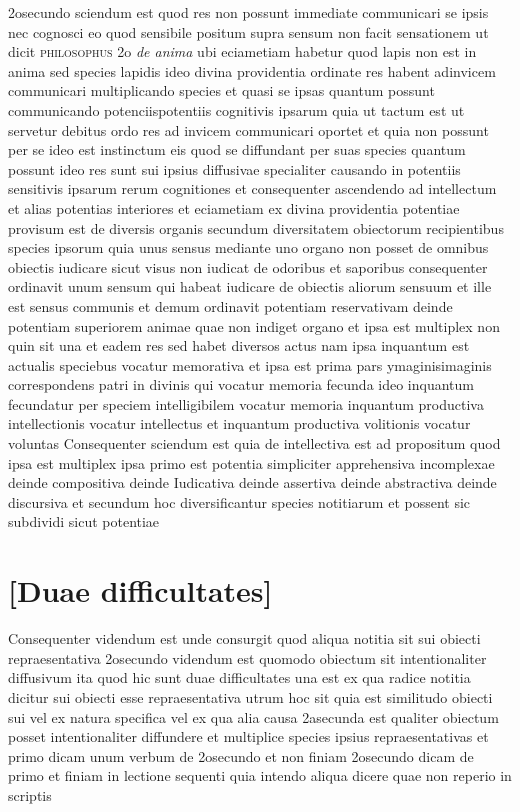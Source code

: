 \documentclass[twoside, openright]{report}
\newcommand{\name}[1]{\textsc{#1}}
\newcommand{\worktitle}[1]{\textit{#1}}
\begin{document}
        \pstart
        2osecundo sciendum est quod res non possunt immediate communicari se ipsis nec cognosci eo quod sensibile positum supra sensum non facit sensationem ut dicit \name{philosophus} 2o \worktitle{de anima} ubi eciametiam habetur quod lapis non est in anima sed species lapidis ideo divina providentia ordinate res habent adinvicem communicari multiplicando species et quasi se ipsas quantum possunt communicando potenciispotentiis cognitivis ipsarum quia ut tactum est ut servetur debitus ordo res ad invicem communicari oportet et quia non possunt per se ideo est instinctum eis quod se diffundant per suas species quantum possunt ideo res sunt sui ipsius diffusivae specialiter causando in potentiis sensitivis ipsarum rerum cognitiones et consequenter ascendendo ad intellectum et alias potentias interiores et eciametiam ex divina providentia potentiae provisum est de diversis organis secundum diversitatem obiectorum recipientibus species ipsorum quia unus sensus mediante uno organo non posset de omnibus obiectis iudicare sicut visus non iudicat de odoribus et saporibus consequenter ordinavit unum sensum qui habeat iudicare de obiectis aliorum sensuum et ille est sensus communis et demum ordinavit potentiam reservativam deinde potentiam superiorem animae quae non indiget organo et ipsa est multiplex non quin sit una et eadem res sed habet diversos actus nam ipsa inquantum est actualis speciebus vocatur memorativa et ipsa est prima pars ymaginisimaginis correspondens patri in divinis qui vocatur memoria fecunda ideo inquantum fecundatur per speciem intelligibilem vocatur memoria inquantum productiva intellectionis vocatur intellectus et inquantum productiva volitionis vocatur voluntas Consequenter sciendum est quia de intellectiva est ad propositum quod ipsa est multiplex ipsa primo est potentia simpliciter apprehensiva incomplexae deinde compositiva deinde Iudicativa deinde assertiva deinde abstractiva deinde discursiva et secundum hoc diversificantur species notitiarum et possent sic subdividi sicut potentiae
        \pend
      
        \bigskip
         \section*{[Duae difficultates]} 
        \pstart
        Consequenter videndum est unde consurgit quod aliqua notitia sit sui obiecti repraesentativa 2osecundo videndum est quomodo obiectum sit intentionaliter diffusivum ita quod hic sunt duae difficultates una est ex qua radice notitia dicitur sui obiecti esse repraesentativa utrum hoc sit quia est similitudo obiecti sui vel ex natura specifica vel ex qua alia causa 2asecunda est qualiter obiectum posset intentionaliter diffundere et multiplice species ipsius repraesentativas et primo dicam unum verbum de 2osecundo et non finiam 2osecundo dicam de primo et finiam in lectione sequenti quia intendo aliqua dicere quae non reperio in scriptis
        \pend
      
\end{document}
